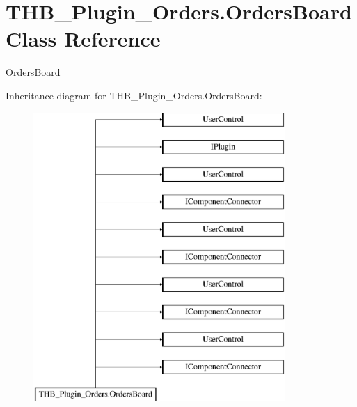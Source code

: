 \hypertarget{class_t_h_b___plugin___orders_1_1_orders_board}{}\section{T\+H\+B\+\_\+\+Plugin\+\_\+\+Orders.\+Orders\+Board Class Reference}
\label{class_t_h_b___plugin___orders_1_1_orders_board}


\mbox{\hyperlink{class_t_h_b___plugin___orders_1_1_orders_board}{Orders\+Board}}  


Inheritance diagram for T\+H\+B\+\_\+\+Plugin\+\_\+\+Orders.\+Orders\+Board\+:\begin{figure}[H]
\begin{center}
\leavevmode
\includegraphics[height=11.000000cm]{dd/d7c/class_t_h_b___plugin___orders_1_1_orders_board}
\end{center}
\end{figure}
